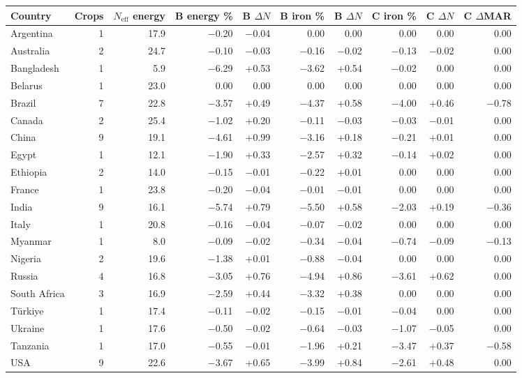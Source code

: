 \begin{tabular}{@{}lrrrrrrrrr@{}}
\toprule
Country & Crops & $N_{\text{eff}}$ energy & B energy \% & B $\Delta N$ & B iron \% & B $\Delta N$ & C iron \% & C $\Delta N$ & C $\Delta$MAR \\
\midrule
Argentina & 1 & 17.9 & $-$0.20 & $-$0.04 & 0.00 & 0.00 & 0.00 & 0.00 & 0.00 \\
Australia & 2 & 24.7 & $-$0.10 & $-$0.03 & $-$0.16 & $-$0.02 & $-$0.13 & $-$0.02 & 0.00 \\
Bangladesh & 1 & 5.9 & $-$6.29 & +0.53 & $-$3.62 & +0.54 & $-$0.02 & 0.00 & 0.00 \\
Belarus & 1 & 23.0 & 0.00 & 0.00 & 0.00 & 0.00 & 0.00 & 0.00 & 0.00 \\
Brazil & 7 & 22.8 & $-$3.57 & +0.49 & $-$4.37 & +0.58 & $-$4.00 & +0.46 & $-$0.78 \\
Canada & 2 & 25.4 & $-$1.02 & +0.20 & $-$0.11 & $-$0.03 & $-$0.03 & $-$0.01 & 0.00 \\
China & 9 & 19.1 & $-$4.61 & +0.99 & $-$3.16 & +0.18 & $-$0.21 & +0.01 & 0.00 \\
Egypt & 1 & 12.1 & $-$1.90 & +0.33 & $-$2.57 & +0.32 & $-$0.14 & +0.02 & 0.00 \\
Ethiopia & 2 & 14.0 & $-$0.15 & $-$0.01 & $-$0.22 & +0.01 & 0.00 & 0.00 & 0.00 \\
France & 1 & 23.8 & $-$0.20 & $-$0.04 & $-$0.01 & $-$0.01 & 0.00 & 0.00 & 0.00 \\
India & 9 & 16.1 & $-$5.74 & +0.79 & $-$5.50 & +0.58 & $-$2.03 & +0.19 & $-$0.36 \\
Italy & 1 & 20.8 & $-$0.16 & $-$0.04 & $-$0.07 & $-$0.02 & 0.00 & 0.00 & 0.00 \\
Myanmar & 1 & 8.0 & $-$0.09 & $-$0.02 & $-$0.34 & $-$0.04 & $-$0.74 & $-$0.09 & $-$0.13 \\
Nigeria & 2 & 19.6 & $-$1.38 & +0.01 & $-$0.88 & $-$0.04 & 0.00 & 0.00 & 0.00 \\
Russia & 4 & 16.8 & $-$3.05 & +0.76 & $-$4.94 & +0.86 & $-$3.61 & +0.62 & 0.00 \\
South Africa & 3 & 16.9 & $-$2.59 & +0.44 & $-$3.32 & +0.38 & 0.00 & 0.00 & 0.00 \\
T\"urkiye & 1 & 17.4 & $-$0.11 & $-$0.02 & $-$0.15 & $-$0.01 & $-$0.04 & 0.00 & 0.00 \\
Ukraine & 1 & 17.6 & $-$0.50 & $-$0.02 & $-$0.64 & $-$0.03 & $-$1.07 & $-$0.05 & 0.00 \\
Tanzania & 1 & 17.0 & $-$0.55 & $-$0.01 & $-$1.96 & +0.21 & $-$3.47 & +0.37 & $-$0.58 \\
USA & 9 & 22.6 & $-$3.67 & +0.65 & $-$3.99 & +0.84 & $-$2.61 & +0.48 & 0.00 \\
\bottomrule
\end{tabular}
